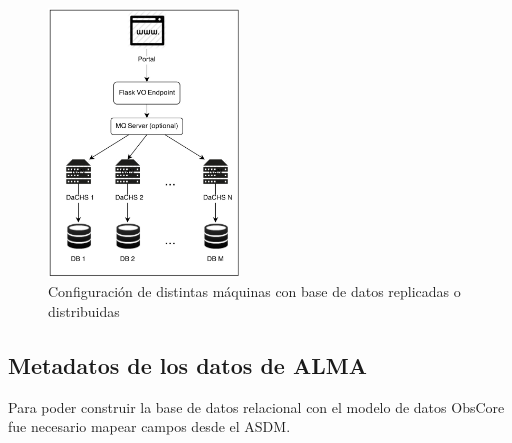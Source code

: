 \begin{figure}[h]
    \centering
    \includegraphics[width=0.45\textwidth]{images/interaccion.png}
    \caption{Configuración de distintas máquinas con base de datos replicadas o distribuidas}
    \label{fig:dachs}
\end{figure}

\subsection{Metadatos de los datos de ALMA}

Para poder construir la base de datos relacional con el modelo de datos ObsCore fue
necesario mapear campos desde el ASDM.

